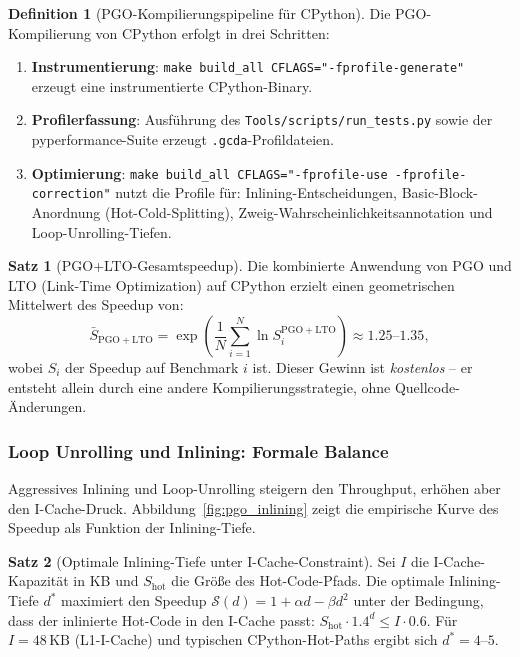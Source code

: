 ﻿\documentclass[a4paper,12pt]{scrreprt}
\theoremstyle{definition}
\newtheorem{definition}{Definition}[section]
\newtheorem{satz}{Satz}[section]
\begin{document}
	\begin{definition}[PGO-Kompilierungspipeline für CPython]
		\label{def:pgo}
		Die PGO-Kompilierung von CPython erfolgt in drei Schritten:
		\begin{enumerate}[noitemsep]
			\item \textbf{Instrumentierung}: \texttt{make build\_all CFLAGS="-fprofile-generate"}
			erzeugt eine instrumentierte CPython-Binary.
			\item \textbf{Profilerfassung}: Ausführung des
			\texttt{Tools/scripts/run\_tests.py} sowie der pyperformance-Suite
			erzeugt \texttt{.gcda}-Profildateien.
			\item \textbf{Optimierung}: \texttt{make build\_all CFLAGS="-fprofile-use -fprofile\newline -correction"}
			nutzt die Profile für: Inlining-Entscheidungen, Basic-Block-Anord\-nung
			(Hot-Cold-Splitting), Zweig-Wahrscheinlichkeitsannotation und
			Loop-Unrolling-Tiefen.
		\end{enumerate}
	\end{definition}
	
	\begin{satz}[PGO+LTO-Gesamtspeedup]
		\label{satz:pgo_total}
		Die kombinierte Anwendung von PGO und LTO (Link-Time Optimization)
		auf CPython erzielt einen geometrischen Mittelwert des Speedup von:
		\[
		\bar{S}_{\mathrm{PGO+LTO}} = \exp\!\left(\frac{1}{N}
		\sum_{i=1}^N \ln S_i^{\mathrm{PGO+LTO}}\right) \approx 1.25\text{--}1.35,
		\]
		wobei $S_i$ der Speedup auf Benchmark $i$ ist. Dieser Gewinn ist
		\emph{kostenlos} -- er entsteht allein durch eine andere
		Kompilierungsstrategie, ohne Quellcode-Änderungen.
	\end{satz}
	
	\subsubsection{Loop Unrolling und Inlining: Formale Balance}
	
	Aggressives Inlining und Loop-Unrolling steigern den Throughput,
	erhöhen aber den I-Cache-Druck. Abbildung~\ref{fig:pgo_inlining}
	zeigt die empirische Kurve des Speedup als Funktion der Inlining-Tiefe.
	
	\begin{satz}[Optimale Inlining-Tiefe unter I-Cache-Constraint]
		\label{satz:inlining_depth}
		Sei $I$ die I-Cache-Kapazität in KB und $S_{\mathrm{hot}}$ die Größe
		des Hot-Code-Pfads. Die optimale Inlining-Tiefe $d^*$ maximiert den
		Speedup $\mathcal{S}(d) = 1 + \alpha d - \beta d^2$ unter der Bedingung,
		dass der inlinierte Hot-Code in den I-Cache passt:
		$S_{\mathrm{hot}} \cdot 1.4^d \le I \cdot 0.6$. Für
		$I = 48\,\mathrm{KB}$ (L1-I-Cache) und typischen CPython-Hot-Paths
		ergibt sich $d^* = 4$--$5$.
	\end{satz}
	
\end{document}
